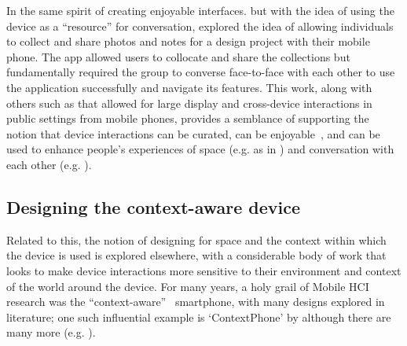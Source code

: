 In the same spirit of creating enjoyable interfaces. but with the idea of using the device as a ``resource'' for conversation, \citet[p. 232]{Porcheron2016b} explored the idea of allowing individuals to collect and share photos and notes for a design project with their mobile phone.
The app allowed users to collocate and share the collections but fundamentally required the group to converse face-to-face with each other to use the application successfully and navigate its features.
This work, along with others such as \citet{Lucero2012} that allowed for large display and cross-device interactions in public settings from mobile phones, provides a semblance of supporting the notion that device interactions can be curated, can be enjoyable~\citep{Brown2015a}, and can be used to enhance people's experiences of space (e.g. as in \citet{Bull2005}) and conversation with each other (e.g. \citet{Lundgren2013}).






\subsection{Designing the context-aware device}\label{sec:background litreview design mobilehci context}
Related to this, the notion of designing for space and the context within which the device is used is explored elsewhere, with a considerable body of work that looks to make device interactions more sensitive to their environment and context of the world around the device.
For many years, a holy grail of Mobile \ac{HCI} research was the ``context-aware''~\citep{Schilit1994} smartphone, with many designs explored in literature; one such influential example is `ContextPhone' by \citet{Raento2005} although there are many more (e.g. \citet{Siewiorek2003,Gellersen2002}).


